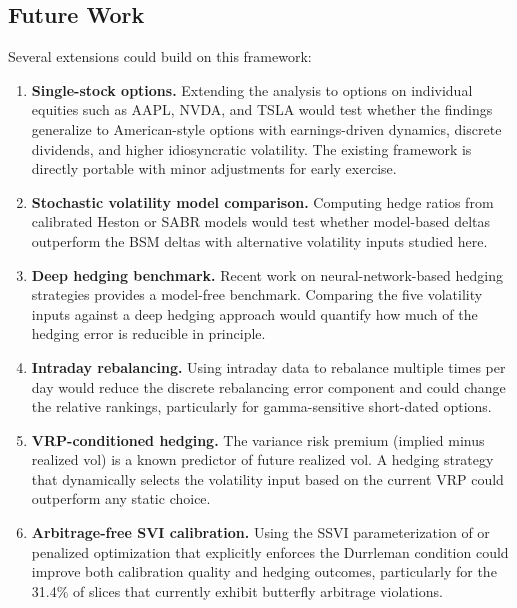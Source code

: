 \documentclass[12pt, letterpaper]{article}
\begin{document}
\subsection{Future Work}

Several extensions could build on this framework:

\begin{enumerate}
    \item \textbf{Single-stock options.} Extending the analysis to options on individual equities such as AAPL, NVDA, and TSLA would test whether the findings generalize to American-style options with earnings-driven dynamics, discrete dividends, and higher idiosyncratic volatility. The existing framework is directly portable with minor adjustments for early exercise.

    \item \textbf{Stochastic volatility model comparison.} Computing hedge ratios from calibrated Heston or SABR models would test whether model-based deltas outperform the BSM deltas with alternative volatility inputs studied here.

    \item \textbf{Deep hedging benchmark.} Recent work on neural-network-based hedging strategies \citep{Buehler2019} provides a model-free benchmark. Comparing the five volatility inputs against a deep hedging approach would quantify how much of the hedging error is reducible in principle.

    \item \textbf{Intraday rebalancing.} Using intraday data to rebalance multiple times per day would reduce the discrete rebalancing error component and could change the relative rankings, particularly for gamma-sensitive short-dated options.

    \item \textbf{VRP-conditioned hedging.} The variance risk premium (implied minus realized vol) is a known predictor of future realized vol. A hedging strategy that dynamically selects the volatility input based on the current VRP could outperform any static choice.

    \item \textbf{Arbitrage-free SVI calibration.} Using the SSVI parameterization of \citet{Gatheral2014} or penalized optimization that explicitly enforces the Durrleman condition could improve both calibration quality and hedging outcomes, particularly for the 31.4\% of slices that currently exhibit butterfly arbitrage violations.
\end{enumerate}
\end{document}

